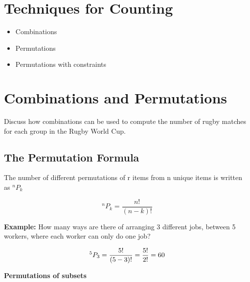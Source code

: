 \documentclass[]{report}
\begin{document}
	
	
	
	
	\section{Techniques for Counting}
	
	
	\begin{itemize}
		\item Combinations
		\item Permutations
		\item Permutations with constraints
	\end{itemize}
	
	\section{ Combinations and Permutations }
	

	

	\bigskip
	Discuss how combinations can be used to compute the number of rugby matches for each group in the Rugby World Cup.
	
	\subsection{The Permutation Formula}
	The number of different permutations of r items from n unique items is written as $^n P_k$
	
	
	\[ ^n P_k = \frac{n!}{(n-k)!}\]
	
	
	{
		
		\noindent \textbf{Example:}
		How many ways are there of arranging 3 different jobs, between 5 workers, where each worker can only do one job?
		
		
		\[ ^5 P_3 = \frac{5!}{(5-3)!}  = {5! \over 2!} = 60\]
		
	}
	
	
	
	
	
	
	
	
	\noindent \textbf{Permutations of subsets}
	
\end{document}
